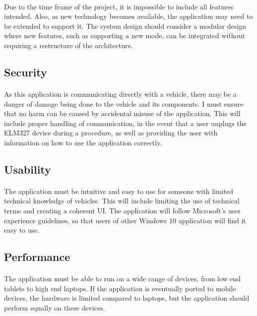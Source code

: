 		\paragraph{}{
		Due to the time frame of the project, it is impossible to include all features intended. Also, as new technology becomes available, the application may need to be extended to support it. The system design should consider a modular design where new features, such as supporting a new mode, can be integrated without requiring a restructure of the architecture.
		}
	\subsection{Security}
		\paragraph{}{
		As this application is communicating directly with a vehicle, there may be a danger of damage being done to the vehicle and its components. I must ensure that no harm can be caused by accidental misuse of the application. This will include proper handling of communication, in the event that a user unplugs the ELM327 device during a procedure, as well as providing the user with information on how to use the application correctly.
		}		
	\subsection{Usability}
		\paragraph{}{
		The application must be intuitive and easy to use for someone with limited technical knowledge of vehicles. This will include limiting the use of technical terms and creating a coherent UI. The application will follow Microsoft's user experience guidelines, so that users of other Windows 10 application will find it easy to use.
		}
	\subsection{Performance}
		\paragraph{}{
		The application must be able to run on a wide range of devices, from low end tablets to high end laptops. If the application is eventually ported to mobile devices, the hardware is limited compared to laptops, but the application should perform equally on these devices.
		}